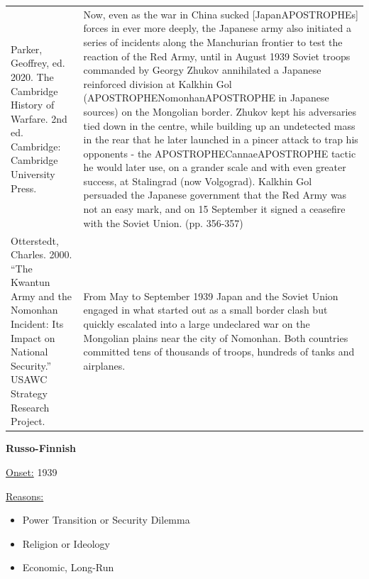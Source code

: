 {\begin{longtable}{p{}p{}}
Parker, Geoffrey, ed. 2020. The Cambridge History of Warfare. 2nd ed. Cambridge: Cambridge University Press. & Now, even as the war in China sucked [JapanAPOSTROPHEs] forces in ever more deeply, the Japanese army also initiated a series of incidents along the Manchurian frontier to test the reaction of the Red Army, until in August 1939 Soviet troops commanded by Georgy Zhukov annihilated a Japanese reinforced division at Kalkhin Gol (APOSTROPHENomonhanAPOSTROPHE in Japanese sources) on the Mongolian border. Zhukov kept his adversaries tied down in the centre, while building up an undetected mass in the rear that he later launched in a pincer attack to trap his opponents - the APOSTROPHECannaeAPOSTROPHE tactic he would later use, on a grander scale and with even greater success, at Stalingrad (now Volgograd). Kalkhin Gol persuaded the Japanese government that the Red Army was not an easy mark, and on 15 September it signed a ceasefire with the Soviet Union. (pp. 356-357)
\\
Otterstedt, Charles. 2000. “The Kwantun Army and the Nomonhan Incident: Its Impact on National Security.” USAWC Strategy Research Project. & From May to September 1939 Japan and the Soviet Union engaged in what started out as a small border clash but quickly escalated into a large undeclared war on the Mongolian plains near the city of Nomonhan. Both countries committed tens of thousands of troops, hundreds of tanks and airplanes. 
\\
\end{longtable}}
\clearpage
         \textbf{Russo-Finnish} 

          \underline{Onset:} 1939         

\underline{Reasons:}
\begin{itemize}
\item Power Transition or Security Dilemma
\item Religion or Ideology
\item Economic, Long-Run
\end{itemize}

